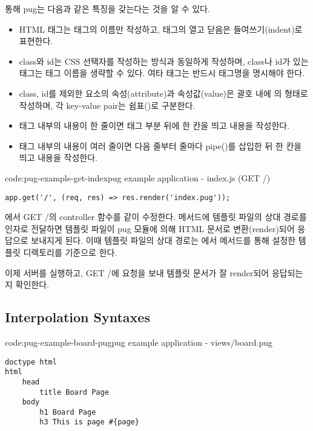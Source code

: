 \를 통해 pug는 다음과 같은 특징을 갖는다는 것을 알 수 있다.

\begin{itemize}
    \item HTML 태그는 태그의 이름만 작성하고, 태그의 열고 닫음은 들여쓰기(indent)로 표현한다.
    \item class와 id는 CSS 선택자를 작성하는 방식과 동일하게 작성하며, class나 id가 있는  태그는 태그 이름을 생략할 수 있다. 여타 태그는 반드시 태그명을 명시해야 한다.
    \item class, id를 제외한 요소의 속성(attribute)과 속성값(value)은 괄호 내에 의 형태로 작성하며, 각 key-value pair는 쉼표(\cd{,})로 구분한다.
    \item 태그 내부의 내용이 한 줄이면 태그 부분 뒤에 한 칸을 띄고 내용을 작성한다.
    \item 태그 내부의 내용이 여러 줄이면 다음 줄부터 줄마다 pipe(\cd{|})를 삽입한 뒤 한 칸을 띄고 내용을 작성한다.
\end{itemize}

\begin{code}{code:pug-example-get-index}{pug example application - index.js (GET /)}
\begin{verbatim}
app.get('/', (req, res) => res.render('index.pug'));
\end{verbatim}
\end{code}

에서 GET /의 controller 함수를 \와 같이 수정한다.  메서드에 템플릿 파일의 상대 경로를 인자로 전달하면 템플릿 파일이 pug 모듈에 의해 HTML 문서로 변환(render)되어 응답으로 보내지게 된다. 이때 템플릿 파일의 상대 경로는 에서  메서드를 통해 설정한 템플릿 디렉토리를 기준으로 한다.

이제 서버를 실행하고, GET /에 요청을 보내 템플릿 문서가 잘 render되어 응답되는지 확인한다.

\subsection*{Interpolation Syntaxes}

\begin{code}{code:pug-example-board-pug}{pug example application - views/board.pug}
\begin{verbatim}
doctype html
html
    head
        title Board Page
    body
        h1 Board Page
        h3 This is page #{page}
\end{verbatim}
\end{code}

